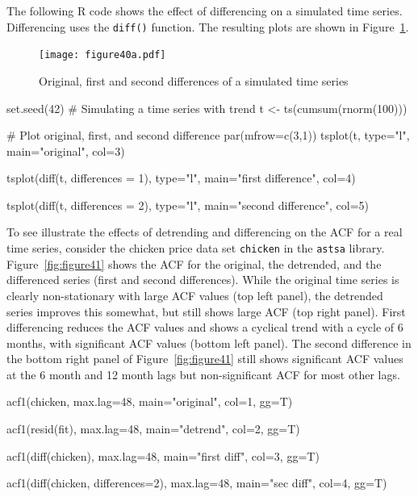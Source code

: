 The following R code shows the effect of differencing on a simulated time series. Differencing uses the \texttt{diff()} function. The resulting plots are shown in Figure~\ref{fig:figure40a}.

\begin{figure}
\centering
\texttt{[image: figure40a.pdf]}
\caption{Original, first and second differences of a simulated time series}
\label{fig:figure40a}
\end{figure}

\begin{samepage}
\begin{Rcode}
set.seed(42)
# Simulating a time series with trend
t <- ts(cumsum(rnorm(100))) 

# Plot original, first, and second difference
par(mfrow=c(3,1))
tsplot(t, type="l", 
    main="original", col=3)

tsplot(diff(t, differences = 1), type="l", 
    main="first difference", col=4)

tsplot(diff(t, differences = 2), type="l", 
    main="second difference", col=5)
\end{Rcode}
\end{samepage}

To see illustrate the effects of detrending and differencing on the ACF for a real time series, consider the chicken price data set \texttt{chicken} in the \texttt{astsa} library. Figure~\ref{fig:figure41} shows the ACF for the original, the detrended, and the differenced series (first and second differences). While the original time series is clearly non-stationary with large ACF values (top left panel), the detrended series improves this somewhat, but still shows large ACF (top right panel). First differencing reduces the ACF values and shows a cyclical trend with a cycle of 6 months, with significant ACF values (bottom left panel). The second difference in the bottom right panel of Figure~\ref{fig:figure41} still shows significant ACF values at the 6 month and 12 month lags but non-significant ACF for most other lags. 

\begin{Rcode}
acf1(chicken, max.lag=48, main="original", col=1, gg=T)

acf1(resid(fit), max.lag=48, main="detrend", col=2, gg=T)

acf1(diff(chicken), max.lag=48, 
    main="first diff", col=3, gg=T)

acf1(diff(chicken, differences=2), max.lag=48, 
    main="sec diff", col=4, gg=T)
\end{Rcode}

